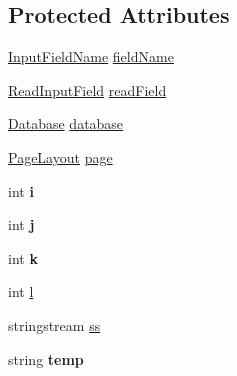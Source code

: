 \subsection*{Protected Attributes}
\begin{DoxyCompactItemize}
\item 
\hyperlink{classInputFieldName}{Input\-Field\-Name} \hyperlink{classInputDetail_ac6f85380c5152c406d483726382c4798}{field\-Name}
\item 
\hyperlink{classReadInputField}{Read\-Input\-Field} \hyperlink{classInputDetail_ac0cc70b017ef94fb55acb46fc44f0df5}{read\-Field}
\item 
\hyperlink{classDatabase}{Database} \hyperlink{classInputDetail_a479cd6c13833bd5de6e5630078c961b6}{database}
\item 
\hyperlink{classPageLayout}{Page\-Layout} \hyperlink{classInputDetail_ae487757aaafba4ac372c327e2b7a9673}{page}
\item 
\hypertarget{classInputDetail_a2e9226db1b744de4bf406398f48cf962}{int {\bfseries i}}\label{classInputDetail_a2e9226db1b744de4bf406398f48cf962}

\item 
\hypertarget{classInputDetail_af124a26cb4e4f86d0d9eb68200ee500b}{int {\bfseries j}}\label{classInputDetail_af124a26cb4e4f86d0d9eb68200ee500b}

\item 
\hypertarget{classInputDetail_a1bb6b8bff3d5fc6d5c998e4c451035bc}{int {\bfseries k}}\label{classInputDetail_a1bb6b8bff3d5fc6d5c998e4c451035bc}

\item 
int \hyperlink{classInputDetail_a3a950727518c2f6ed3c068125a037b9e}{l}
\item 
stringstream \hyperlink{classInputDetail_a5284736b5fd3db0251cfeab7c581c0bd}{ss}
\item 
\hypertarget{classInputDetail_abacd5d7ee7ebd7e9f36bbf3fefd13a5d}{string {\bfseries temp}}\label{classInputDetail_abacd5d7ee7ebd7e9f36bbf3fefd13a5d}


\end{DoxyCompactItemize}
